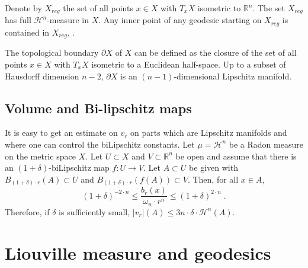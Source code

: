 \documentclass[12pt,leqno]{amsart}
\numberwithin{equation}{section}
\theoremstyle{definition}
\theoremstyle{remark}
\newtheorem{rem}[thm]{Remark}
\newcommand{\R}{\mathbb{R}}
\def\:{\colon}
\begin{document}
Denote by $X_{reg}$ the set of all points $x\in X$ with $T_xX$   isometric to $\R^n$.  The set $X_{reg}$ has full $\mathcal H^n$-measure in $X$.
Any inner point of any geodesic starting on $X_{reg}$ is contained in $X_{reg}$, \cite{Petparallel}.


The topological boundary $\partial X$ of $X$ can be defined as the closure of the  set of all points $x\in X$ with $T_xX$ isometric to a Euclidean half-space. Up to a subset of Hausdorff dimension $n-2$, $\partial X$ is an $(n-1)$-dimensional Lipschitz manifold.


\subsection{Volume and Bi-lipschitz maps}
It is easy to get an estimate on $v_r$  on parts which are Lipschitz manifolds and where one can control the biLipschitz constants.
Let $\mu =\mathcal H^n$ be a Radon measure on the metric space $X$.
Let $U\subset X$ and $V\subset \R^n$ be open and assume that there is an $(1+\delta)$-biLipschitz map
$f\:U \to V$.  %
 Let $A\subset U$ be given with
$B_{(1+\delta) \cdot  r} (A) \subset U$ and $B_{(1+\delta) \cdot r} (f(A)) \subset V$.  Then, for all $x\in A$,
\begin{equation} \label{eq:bilip}
(1+\delta)  ^{-2\cdot n} \leq \frac {b_r(x)} {\omega _n \cdot  r^n} \leq (1+\delta ) ^{2\cdot n} \; .
\end{equation}
Therefore, if $\delta $ is sufficiently small,  $|v_r | (A) \leq  3 n \cdot   \delta \cdot \mathcal H^n (A).$







\section{Liouville measure and geodesics} \label{sec:Liou}
\end{document}
